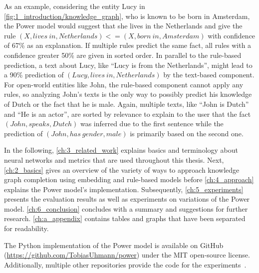 As an example, considering the entity Lucy in \autoref{fig:1_introduction/knowledge_graph}, who is known to be born in Amsterdam, the Power model would suggest that she lives in the Netherlands and give the rule $(X, lives~in, Netherlands) <= (X, born~in, Amsterdam)$ with confidence of 67\% as an explanation. If multiple rules predict the same fact, all rules with a confidence greater 50\% are given in sorted order. In parallel to the rule-based prediction, a text about Lucy, like ``Lucy is from the Netherlands'', might lead to a 90\% prediction of $(Lucy, lives~in, Netherlands)$ by the text-based component. For open-world entities like John, the rule-based component cannot apply any rules, so analyzing John's texts is the only way to possibly predict his knowledge of Dutch or the fact that he is male. Again, multiple texts, like ``John is Dutch'' and ``He is an actor'', are sorted by relevance to explain to the user that the fact $(John, speaks, Dutch)$ was inferred due to the first sentence while the prediction of $(John, has~gender, male)$ is primarily based on the second one.

In the following, \autoref{ch:3_related_work} explains basics and terminology about neural networks and metrics that are used throughout this thesis. Next, \autoref{ch:2_basics} gives an overview of the variety of ways to approach knowledge graph completion using embedding and rule-based models before \autoref{ch:4_approach} explains the Power model's implementation. Subsequently, \autoref{ch:5_experiments} presents the evaluation results as well as experiments on variations of the Power model. \autoref{ch:6_conclusion} concludes with a summary and suggestions for further research. \autoref{ch:a_appendix} contains tables and graphs that have been separated for readability.

The Python implementation of the Power model is available on GitHub (\url{https://github.com/TobiasUhmann/power}) under the MIT open-source license. Additionally, multiple other repositories provide the code for the experiments~\cite{}.
